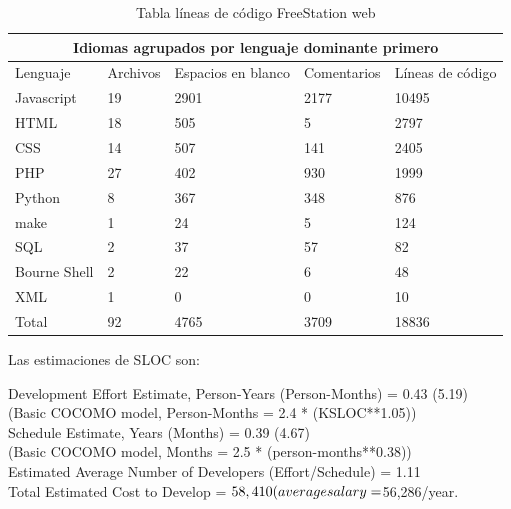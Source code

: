 \begin{table}[ht]
    \centering
\begin{tabular}{|l|l|l|l|l|}
  \hline
  \multicolumn{5}{|c|}{Idiomas agrupados por lenguaje dominante primero}
  \\
  \hline
  Lenguaje & Archivos & Espacios en blanco & Comentarios & Líneas de código \\
  Javascript        &              19   &       2901      &     2177    & 10495\\ 
  HTML        &                    18        &    505   &     5     & 2797\\ 
  CSS          &                   14           & 507  &       141 & 2405\\ 
  PHP           &                  27         &   402   &     930  & 1999 \\
  Python       &                    8          &  367   &    348   &   876\\ 
  make         &                    1         &    24   &      5     &   124\\ 
  SQL        &                      2        &     37    &     57      &   82\\ 
  Bourne Shell  &                   2       &      22    &    6    & 48\\  
  XML           &                   1         &     0    &          0  &  10\\ 
  Total & 92    &       4765    &       3709       & 18836\\
  \hline
\end{tabular}
    \caption{Tabla líneas de código FreeStation web}
     \label{tab:slocweb}
\end{table}

Las estimaciones de SLOC son:

Development Effort Estimate, Person-Years (Person-Months) = 0.43 (5.19) \\
 (Basic COCOMO model, Person-Months = 2.4 * (KSLOC**1.05)) \\
Schedule Estimate, Years (Months)                         = 0.39 (4.67) \\
 (Basic COCOMO model, Months = 2.5 * (person-months**0.38)) \\
Estimated Average Number of Developers (Effort/Schedule)  = 1.11 \\
Total Estimated Cost to Develop                           = $ 58,410 \\
 (average salary = $56,286/year. \\

